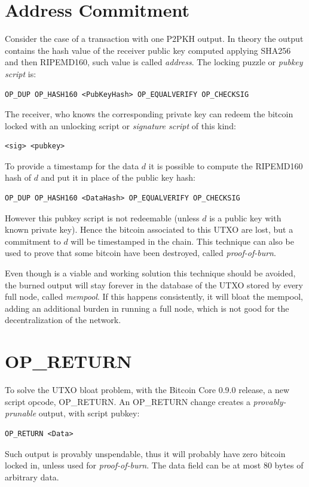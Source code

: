 \section{Address Commitment}
Consider the case of a transaction with one P2PKH output. In theory the output contains the hash value of the receiver public key computed applying SHA256 and then RIPEMD160, such value is called \textit{address}. The locking puzzle or \textit{pubkey script} is:
\begin{verbatim}
OP_DUP OP_HASH160 <PubKeyHash> OP_EQUALVERIFY OP_CHECKSIG
\end{verbatim}
The receiver, who knows the corresponding private key can redeem the bitcoin locked with an unlocking script or \textit{signature script} of this kind:
\begin{verbatim}
<sig> <pubkey>
\end{verbatim} 
To provide a timestamp for the data $d$ it is possible to compute the RIPEMD160 hash of $d$ and put it in place of the public key hash:
\begin{verbatim}
OP_DUP OP_HASH160 <DataHash> OP_EQUALVERIFY OP_CHECKSIG
\end{verbatim}
However this pubkey script is not redeemable (unless $d$ is a public key with known private key). Hence the bitcoin associated to this UTXO are lost, but a commitment to $d$ will be timestamped in the chain. 
This technique can also be used to prove that some bitcoin have been destroyed, called \textit{proof-of-burn}.

Even though is a viable and working solution this technique should be avoided, the burned output will stay forever in the database of the UTXO stored by every full node, called \textit{mempool}. If this happens consistently, it will bloat the mempool, adding an additional burden in running a full node, which is not good for the decentralization of the network.

\section{OP\_RETURN}
To solve the UTXO bloat problem, with the Bitcoin Core 0.9.0 release, a new script opcode, OP\_RETURN. An OP\_RETURN change creates a \textit{provably-prunable} output, with script pubkey:
\begin{verbatim}
OP_RETURN <Data>
\end{verbatim}
Such output is provably unspendable, thus it will probably have zero bitcoin locked in, unless used for \textit{proof-of-burn}. The data field can be at most 80 bytes of arbitrary data. 

